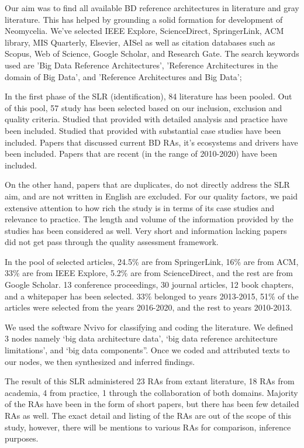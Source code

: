\documentclass[runningheads]{llncs}
\begin{document}
Our aim was to find all available BD reference architectures in literature and gray literature. This has helped by grounding a solid formation for development of Neomycelia. We’ve selected IEEE Explore, ScienceDirect, SpringerLink, ACM library, MIS Quarterly, Elsevier, AISel as well as citation databases such as Scopus, Web of Science, Google Scholar, and Research Gate. The search keywords used are 'Big Data Reference Architectures', 'Reference Architectures in the domain of Big Data', and 'Reference Architectures and Big Data';

In the first phase of the SLR (identification), 84 literature has been pooled. Out of this pool, 57 study has been selected based on our inclusion, exclusion and quality criteria. Studied that provided with detailed analysis and practice have been included. Studied that provided with substantial case studies have been included. Papers that discussed current BD RAs, it’s ecosystems and drivers have been included. Papers that are recent (in the range of 2010-2020) have been included.

On the other hand, papers that are duplicates, do not directly address the SLR aim, and are not written in English are excluded. For our quality factors, we paid extensive attention to how rich the study is in terms of its case studies and relevance to practice. The length and volume of the information provided by the studies has been considered as well. Very short and information lacking papers did not get pass through the quality assessment framework.

In the pool of selected articles, 24.5\% are from SpringerLink, 16\% are from ACM, 33\% are from IEEE Explore, 5.2\% are from ScienceDirect, and the rest are from Google Scholar. 13 conference proceedings, 30 journal articles, 12 book chapters, and a whitepaper has been selected. 33\% belonged to years 2013-2015, 51\% of the articles were selected from the years 2016-2020, and the rest to years 2010-2013.

We used the software Nvivo for classifying and coding the literature. We defined 3 nodes namely ‘big data architecture data’, ‘big data reference architecture limitations’, and ‘big data components”. Once we coded and attributed texts to our nodes, we then synthesized and inferred findings.

The result of this SLR administered 23 RAs from extant literature, 18 RAs from academia, 4 from practice, 1 through the collaboration of both domains. Majority of the RAs have been in the form of short papers, but there has been few detailed RAs as well. The exact detail and listing of the RAs are out of the scope of this study, however, there will be mentions to various RAs for comparison, inference purposes.
\end{document}
